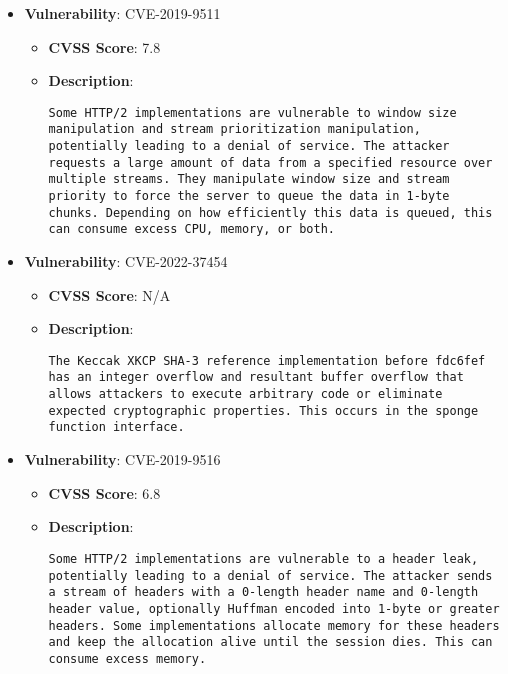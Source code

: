 \documentclass{article}
\begin{document}
\begin{itemize}
        \item \textbf{Vulnerability}: CVE-2019-9511
        \begin{itemize}
            \item \textbf{CVSS Score}:  7.8 
            \item \textbf{Description}:
            \parbox[t]{0.9\linewidth}{
                \verb|Some HTTP/2 implementations are vulnerable to window size manipulation and stream prioritization manipulation, potentially leading to a denial of service. The attacker requests a large amount of data from a specified resource over multiple streams. They manipulate window size and stream priority to force the server to queue the data in 1-byte chunks. Depending on how efficiently this data is queued, this can consume excess CPU, memory, or both.|
            }
        \end{itemize}
    
        \item \textbf{Vulnerability}: CVE-2022-37454
        \begin{itemize}
            \item \textbf{CVSS Score}:  N/A 
            \item \textbf{Description}:
            \parbox[t]{0.9\linewidth}{
                \verb|The Keccak XKCP SHA-3 reference implementation before fdc6fef has an integer overflow and resultant buffer overflow that allows attackers to execute arbitrary code or eliminate expected cryptographic properties. This occurs in the sponge function interface.|
            }
        \end{itemize}
    
        \item \textbf{Vulnerability}: CVE-2019-9516
        \begin{itemize}
            \item \textbf{CVSS Score}:  6.8 
            \item \textbf{Description}:
            \parbox[t]{0.9\linewidth}{
                \verb|Some HTTP/2 implementations are vulnerable to a header leak, potentially leading to a denial of service. The attacker sends a stream of headers with a 0-length header name and 0-length header value, optionally Huffman encoded into 1-byte or greater headers. Some implementations allocate memory for these headers and keep the allocation alive until the session dies. This can consume excess memory.|
            }
        \end{itemize}
    

\end{itemize}
\end{document}
